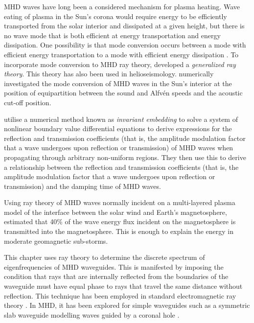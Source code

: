 	MHD waves have long been a considered mechanism for plasma heating. Wave eating of plasma in the Sun's corona would require energy to be efficiently transported from the solar interior and dissipated at a given height, but there is no wave mode that is both efficient at energy transportation and energy dissipation. One possibility is that mode conversion occurs between a mode with efficient energy transportation to a mode with efficient energy dissipation \citep{par_etal12}. To incorporate mode conversion to MHD ray theory, \cite{shu_etal06} developed a \textit{generalized ray theory}. This theory has also been used in helioseismology. \cite{cal06} numerically investigated the mode conversion of MHD waves in the Sun's interior at the position of equipartition between the sound and Alfv\'{e}n speeds and the acoustic cut-off position.
	
	\cite{lee_etal02a} utilise a numerical method known as \textit{invariant embedding} to solve a system of nonlinear boundary value differential equations to derive expressions for the reflection and transmission coefficients (that is, the amplitude modulation factor that a wave undergoes upon reflection or transmission) of MHD waves when propagating through arbitrary non-uniform regions. They then use this to derive a relationship between the reflection and transmission coefficients (that is, the amplitude modulation factor that a wave undergoes upon reflection or transmission) and the damping time of MHD waves.
	
	Using ray theory of MHD waves normally incident on a multi-layered plasma model of the interface between the solar wind and Earth's magnetosphere, \cite{leo_etal03} estimated that 40\% of the wave energy flux incident on the magnetosphere is transmitted into the magnetosphere. This is enough to explain the energy in moderate geomagnetic sub-storms.
	
	This chapter uses ray theory to determine the discrete spectrum of eigenfrequencies of MHD waveguides. This is manifested by imposing the condition that rays that are internally reflected from the boundaries of the waveguide must have equal phase to rays that travel the same distance without reflection. This technique has been employed in standard electromagnetic ray theory \citep{bor_etal99}. In MHD, it has been explored for simple waveguides such as a symmetric slab waveguide modelling waves guided by a coronal hole \citep{dav_85}.
	
	
